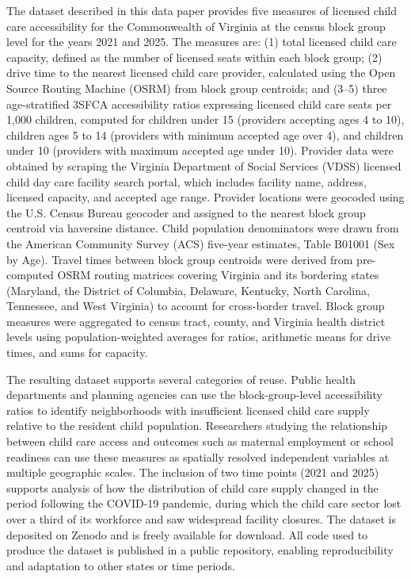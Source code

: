 \documentclass{CUP-JNL-DAP}%
\begin{document}
The dataset described in this data paper provides five measures of licensed child care accessibility for the Commonwealth of Virginia at the census block group level for the years 2021 and 2025. The measures are: (1) total licensed child care capacity, defined as the number of licensed seats within each block group; (2) drive time to the nearest licensed child care provider, calculated using the Open Source Routing Machine (OSRM) from block group centroids; and (3--5) three age-stratified 3SFCA accessibility ratios expressing licensed child care seats per 1,000 children, computed for children under 15 (providers accepting ages 4 to 10), children ages 5 to 14 (providers with minimum accepted age over 4), and children under 10 (providers with maximum accepted age under 10). Provider data were obtained by scraping the Virginia Department of Social Services (VDSS) licensed child day care facility search portal, which includes facility name, address, licensed capacity, and accepted age range. Provider locations were geocoded using the U.S. Census Bureau geocoder and assigned to the nearest block group centroid via haversine distance. Child population denominators were drawn from the American Community Survey (ACS) five-year estimates, Table B01001 (Sex by Age). Travel times between block group centroids were derived from pre-computed OSRM routing matrices covering Virginia and its bordering states (Maryland, the District of Columbia, Delaware, Kentucky, North Carolina, Tennessee, and West Virginia) to account for cross-border travel. Block group measures were aggregated to census tract, county, and Virginia health district levels using population-weighted averages for ratios, arithmetic means for drive times, and sums for capacity.

The resulting dataset supports several categories of reuse. Public health departments and planning agencies can use the block-group-level accessibility ratios to identify neighborhoods with insufficient licensed child care supply relative to the resident child population. Researchers studying the relationship between child care access and outcomes such as maternal employment or school readiness can use these measures as spatially resolved independent variables at multiple geographic scales\citep{morrissey2017,heckman2006}. The inclusion of two time points (2021 and 2025) supports analysis of how the distribution of child care supply changed in the period following the COVID-19 pandemic, during which the child care sector lost over a third of its workforce and saw widespread facility closures\citep{herbst2023}. The dataset is deposited on Zenodo and is freely available for download. All code used to produce the dataset is published in a public repository, enabling reproducibility and adaptation to other states or time periods.
\end{document}
